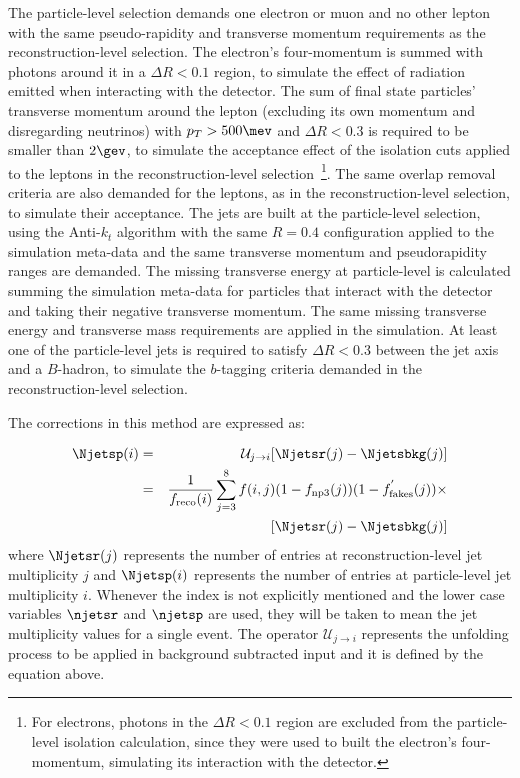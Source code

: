 The particle-level selection demands one electron or muon and no other lepton with the same pseudo-rapidity and transverse momentum
requirements as the reconstruction-level selection. The electron's four-momentum is summed with photons around it in a $\Delta R < 0.1$ region,
to simulate the effect of radiation emitted when interacting with the detector.
The sum of 
final state particles' transverse momentum around the lepton (excluding its own momentum and disregarding neutrinos) with
$p_T > 500\mev$ and $\Delta R < 0.3$ is required to be smaller than $2\gev$, to simulate the acceptance effect of the isolation cuts applied to the
leptons in the reconstruction-level selection~\footnote{For electrons, photons in the $\Delta R < 0.1$ region are excluded from the particle-level
isolation calculation, since they were used to built the electron's four-momentum, simulating its interaction with the detector.}.
The same overlap removal criteria are also demanded for the leptons, as in the reconstruction-level selection,
to simulate their acceptance.
The jets are built at the particle-level selection, using the Anti-$k_t$ algorithm with the same $R=0.4$ configuration applied to the simulation meta-data and the
same transverse momentum and pseudorapidity ranges are demanded.
The missing transverse energy at particle-level is calculated summing the simulation meta-data for particles that interact with the detector and taking their negative
transverse momentum. The same missing transverse energy and transverse mass requirements are applied in the simulation.
At least one of the particle-level jets is required to satisfy $\Delta R < 0.3$ between the jet axis and a $B$-hadron, to simulate the $b$-tagging criteria
demanded in the reconstruction-level selection.

The corrections in this method are expressed as:

\begin{eqnarray}
\Njetsp (i)&=& \mathcal{U}_{j \rightarrow i} [ \Njetsr (j) - \Njetsbkg (j) ] \nonumber \\
&=&\frac{1}{\ensuremath{f_{\mathrm{reco}}}(i)} \sum_{j=3}^{8} f(i, j)
(1 - \ensuremath{f_{\mathrm{np3}}}(j))(1 - \ensuremath{f^{'}_{\mathrm{fakes}}}(j) ) \times \nonumber \\
&& [ \Njetsr (j) - \Njetsbkg (j) ]
\label{eq:unfoldingB}
\end{eqnarray}
where $\Njetsr(j)$ represents the number of entries at reconstruction-level
jet multiplicity $j$ and $\Njetsp(i)$ represents the number of entries at
particle-level jet multiplicity $i$. Whenever the index is not explicitly
mentioned and the lower case variables $\njetsr$ and $\njetsp$ are used,
they will be taken to mean the jet multiplicity
values for a single event. The operator $\mathcal{U}_{j \rightarrow i}$ represents the unfolding process to be applied
in background subtracted input and it is defined by the equation above.

